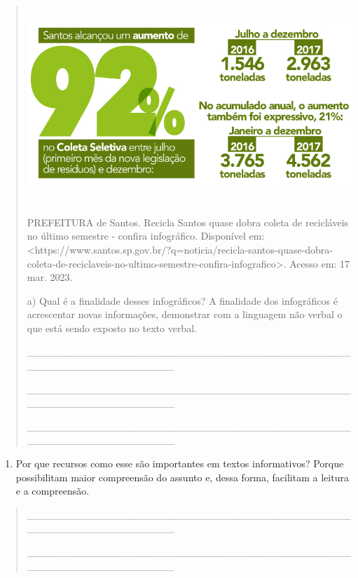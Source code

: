 \begin{itemize}
{{{\begin{itemize}
\begin{itemize}
\begin{itemize}
\begin{quote}
\includegraphics[width=5.90556in,height=2.92847in]{media/image31.jpeg}

PREFEITURA de Santos. Recicla Santos quase dobra coleta de recicláveis
no último semestre - confira infográfico. Disponível em:
\textless{}https://www.santos.sp.gov.br/?q=noticia/recicla-santos-quase-dobra-coleta-de-reciclaveis-no-ultimo-semestre-confira-infografico\textgreater{}.
Acesso em: 17 mar. 2023.

a) Qual é a finalidade desses infográficos? A finalidade dos
infográficos é acrescentar novas informações, demonstrar com a linguagem
não verbal o que está sendo exposto no texto verbal.

\_\_\_\_\_\_\_\_\_\_\_\_\_\_\_\_\_\_\_\_\_\_\_\_\_\_\_\_\_\_\_\_\_\_\_\_\_\_\_\_\_\_\_\_\_\_\_\_\_\_\_\_\_\_\_\_\_\_\_\_\_\_\_\_

\_\_\_\_\_\_\_\_\_\_\_\_\_\_\_\_\_\_\_\_\_\_\_\_\_\_\_\_\_\_\_\_\_\_\_\_\_\_\_\_\_\_\_\_\_\_\_\_\_\_\_\_\_\_\_\_\_\_\_\_\_\_\_\_

\_\_\_\_\_\_\_\_\_\_\_\_\_\_\_\_\_\_\_\_\_\_\_\_\_\_\_\_\_\_\_\_\_\_\_\_\_\_\_\_\_\_\_\_\_\_\_\_\_\_\_\_\_\_\_\_\_\_\_\_\_\_\_\_
\end{quote}

\begin{enumerate}
\def\labelenumi{\alph{enumi})}
\item
  Por que recursos como esse são importantes em textos informativos?
  Porque possibilitam maior compreensão do assunto e, dessa forma,
  facilitam a leitura e a compreensão.
\end{enumerate}

\begin{quote}
\_\_\_\_\_\_\_\_\_\_\_\_\_\_\_\_\_\_\_\_\_\_\_\_\_\_\_\_\_\_\_\_\_\_\_\_\_\_\_\_\_\_\_\_\_\_\_\_\_\_\_\_\_\_\_\_\_\_\_\_\_\_\_\_

\_\_\_\_\_\_\_\_\_\_\_\_\_\_\_\_\_\_\_\_\_\_\_\_\_\_\_\_\_\_\_\_\_\_\_\_\_\_\_\_\_\_\_\_\_\_\_\_\_\_\_\_\_\_\_\_\_\_\_\_\_\_\_\_


\end{quote}
\end{itemize}
\end{itemize}
\end{itemize}}}}
\end{itemize}
